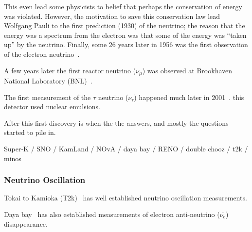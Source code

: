 This even lead some physicists to belief that perhaps the conservation of energy was violated.
However, the motivation to save this conservation law lead Wolfgang Pauli to the first prediction (1930) of the neutrino; the reason that the energy was a spectrum from the electron was that some of the energy was ``taken up'' by the neutrino.
Finally, some 26 years later in 1956 was the first observation of the electron neutrino~\citep{first_neutrino_measurement}.

A few years later the first reactor neutrino ($\nu_{\mu}$) was observed at Brookhaven National Laboratory (BNL)~\citep{PhysRevLett.9.36}.

The first measurement of the $\tau$ neutrino ($\nu_{\tau}$) happened much later in 2001~\citep{donut_first_tau_n_measure}.
this detector used nuclear emulsions.

After this first discovery is when the the answers, and mostly the questions started to pile in.

Super-K / SNO / KamLand / NOvA / daya bay / RENO / double chooz / t2k / minos

\citep{SNO_2002_neutrino_PhysRevLett.89.011301, neutrino_measurement_NOvA_2019_prl, t2k_2011_neutrino_PhysRevLett.107.041801}
\cite{reno_2012_neutrino_PhysRevLett.108.191802}
\citep{FUKUDA2002_solar_neutrino_oscillation}
\citep{kamland_2003_neutrino_PhysRevLett.90.021802}
\citep{daya_bay_2012_neutrino_PhysRevLett.108.171803}
\citep{doubleChooz_2012_neutrino_PhysRevLett.108.131801}



\subsubsection{Neutrino Oscillation}

Tokai to Kamioka (T2k)~\citep{PhysRevD.91.072010_t2k_2015} has well established neutrino oscillation measurements.

Daya bay~\citep{daya_bay_2012_neutrino_PhysRevLett.108.171803} has also established measurements of electron anti-neutrino ($\bar{\nu_{e}}$) disappearance.

